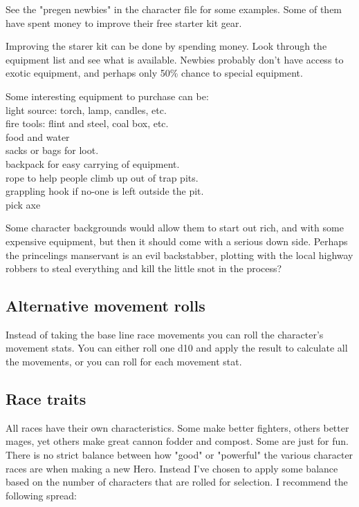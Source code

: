 See the "pregen newbies" in the character file for some examples. Some of them have spent money to improve their free starter kit gear.


Improving the starer kit can be done by spending money. Look through the equipment list and see what is available. Newbies probably don't have access to exotic equipment, and perhaps only 50\% chance to special equipment.

Some interesting equipment to purchase can be: \\
light source: torch, lamp, candles, etc. \\
fire tools: flint and steel, coal box, etc. \\
food and water \\
sacks or bags for loot. \\
backpack for easy carrying of equipment. \\
rope to help people climb up out of trap pits. \\
grappling hook if no-one is left outside the pit. \\
pick axe

Some character backgrounds would allow them to start out rich, and with some expensive equipment, but then it should come with a serious down side. Perhaps the princelings manservant is an evil backstabber, plotting with the local highway robbers to steal everything and kill the little snot in the process?


\subsection*{Alternative movement rolls}
Instead of taking the base line race movements you can roll the character's movement stats. You can either roll one d10 and apply the result to calculate all the movements, or you can roll for each movement stat.


\subsection*{Race traits}
All races have their own characteristics. Some make better fighters, others better mages, yet others make great cannon fodder and compost. Some are just for fun.
There is no strict balance between how "good" or "powerful" the various character races are when making a new Hero. Instead I've chosen to apply some balance based on the number of characters that are rolled for selection. I recommend the following spread:

